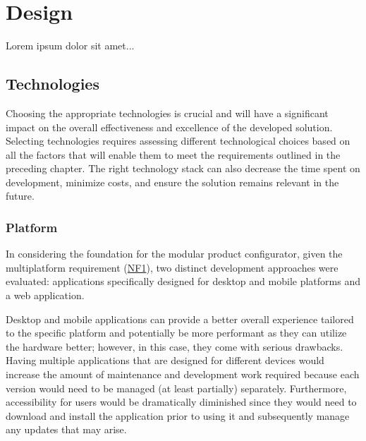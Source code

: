 \chapter{Design}

\begin{chapterabstract}
Lorem ipsum dolor sit amet...
\end{chapterabstract}


\section{Technologies}

Choosing the appropriate technologies is crucial and will have a significant impact on the overall effectiveness and excellence of the developed solution. Selecting technologies requires assessing different technological choices based on all the factors that will enable them to meet the requirements outlined in the preceding chapter. The right technology stack can also decrease the time spent on development, minimize costs, and ensure the solution remains relevant in the future.


\subsection{Platform}

In considering the foundation for the modular product configurator, given the multiplatform requirement (\hyperref[itm:NF1]{NF1}), two distinct development approaches were evaluated: applications specifically designed for desktop and mobile platforms and a web application.

Desktop and mobile applications can provide a better overall experience tailored to the specific platform and potentially be more performant as they can utilize the hardware better; however, in this case, they come with serious drawbacks. Having multiple applications that are designed for different devices would increase the amount of maintenance and development work required because each version would need to be managed (at least partially) separately. Furthermore, accessibility for users would be dramatically diminished since they would need to download and install the application prior to using it and subsequently manage any updates that may arise.

